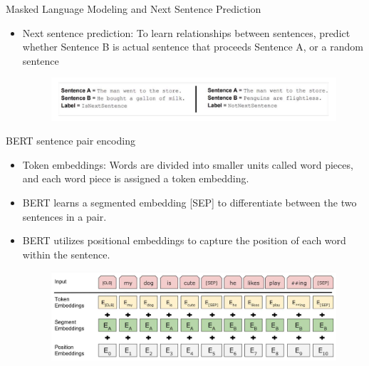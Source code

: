 \documentclass[handout]{beamer}
\begin{document}
\begin{frame}{Masked Language Modeling and Next Sentence Prediction}
\begin{scriptsize}
\begin{itemize}
\item Next sentence prediction: To learn relationships between sentences, predict whether
Sentence B is actual sentence that proceeds Sentence A, or a random sentence

 \begin{figure}[h]
        	\includegraphics[scale = 0.23]{pics/NSP.png}
        \end{figure}  



\end{itemize}
\end{scriptsize}
\end{frame}


\begin{frame}{BERT sentence pair encoding}
\begin{scriptsize}
\begin{itemize}
\item Token embeddings: Words are divided into smaller units called word pieces, and each word piece is assigned a token embedding.
\item BERT learns a segmented embedding [SEP] to differentiate between the two sentences in a pair.
\item BERT utilizes positional embeddings to capture the position of each word within the sentence.

 \begin{figure}[h]
        	\includegraphics[scale = 0.18]{pics/BSPE.png}
        \end{figure}  



\end{itemize}
\end{scriptsize}
\end{frame}
\end{document}
